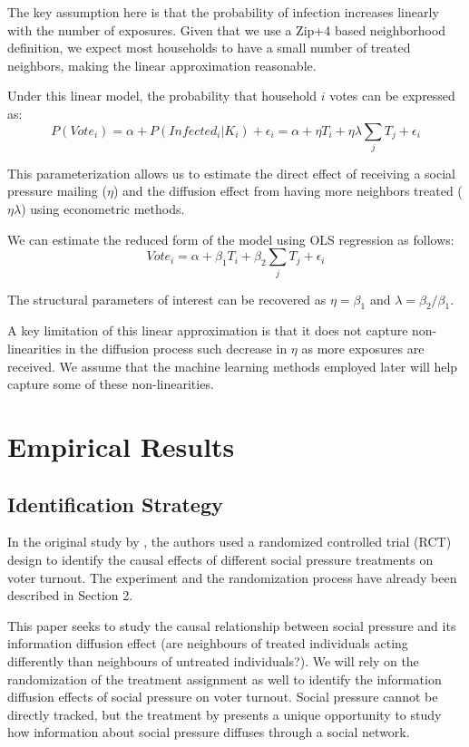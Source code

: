 \documentclass[11pt]{article}
\begin{document}
The key assumption here is that the probability of infection increases linearly with the number of exposures. Given that we use a Zip+4 based neighborhood definition, we expect most households to have a small number of treated neighbors, making the linear approximation reasonable.

Under this linear model, the probability that household $i$ votes can be expressed as:
\begin{equation}
    P(Vote_i) = \alpha + P(Infected_i | K_i) + \epsilon_i = \alpha + \eta T_i + \eta \lambda \sum_{j} T_j + \epsilon_i
\end{equation}

This parameterization allows us to estimate the direct effect of receiving a social pressure mailing ($\eta$) and the diffusion effect from having more neighbors treated ($\eta \lambda$) using econometric methods.

We can estimate the reduced form of the model using OLS regression as follows:
\begin{equation}
    Vote_i = \alpha + \beta_1 T_i + \beta_2 \sum_{j} T_j + \epsilon_i
\end{equation}

The structural parameters of interest can be recovered as $\eta = \beta_1$ and $\lambda = \beta_2 / \beta_1$.

A key limitation of this linear approximation is that it does not capture non-linearities in the diffusion process such decrease in $\eta$ as more exposures are received. We assume that the machine learning methods employed later will help capture some of these non-linearities.

\section{Empirical Results}
\subsection{Identification Strategy}
In the original study by \cite{gerber_social_2008}, the authors used a randomized controlled trial (RCT) design to identify the causal effects of different social pressure treatments on voter turnout. The experiment and the randomization process have already been described in Section 2. 

This paper seeks to study the causal relationship between social pressure and its information diffusion effect (are neighbours of treated individuals acting differently than neighbours of untreated individuals?). We will rely on the randomization of the treatment assignment as well to identify the information diffusion effects of social pressure on voter turnout. Social pressure cannot be directly tracked, but the treatment by \cite{gerber_social_2008} presents a unique opportunity to study how information about social pressure diffuses through a social network.
\end{document}
